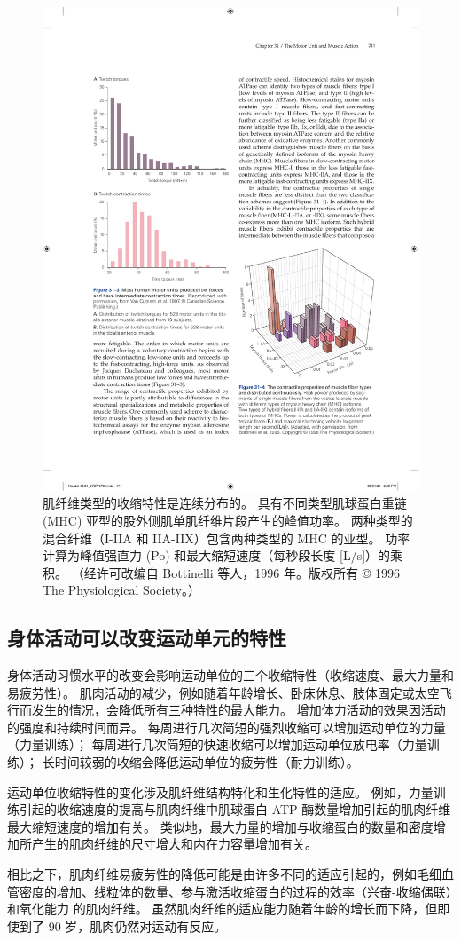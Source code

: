 \begin{figure}[htbp]
	\centering
	\includegraphics[width=0.5\linewidth]{chap31/fig_31_4}
	\caption{肌纤维类型的收缩特性是连续分布的。 具有不同类型肌球蛋白重链 (MHC) 亚型的股外侧肌单肌纤维片段产生的峰值功率。 两种类型的混合纤维（I-IIA 和 IIA-IIX）包含两种类型的 MHC 的亚型。 功率计算为峰值强直力 (Po) 和最大缩短速度（每秒段长度 [L/s]）的乘积。 （经许可改编自 Bottinelli 等人，1996 年。版权所有 © 1996 The Physiological Society。）}
	\label{fig:31_4}
\end{figure}


\subsection{身体活动可以改变运动单元的特性}

身体活动习惯水平的改变会影响运动单位的三个收缩特性（收缩速度、最大力量和易疲劳性）。
肌肉活动的减少，例如随着年龄增长、卧床休息、肢体固定或太空飞行而发生的情况，会降低所有三种特性的最大能力。
增加体力活动的效果因活动的强度和持续时间而异。
每周进行几次简短的强烈收缩可以增加运动单位的力量（力量训练）；
每周进行几次简短的快速收缩可以增加运动单位放电率（力量训练）；
长时间较弱的收缩会降低运动单位的疲劳性（耐力训练）。


运动单位收缩特性的变化涉及肌纤维结构特化和生化特性的适应。
例如，力量训练引起的收缩速度的提高与肌肉纤维中肌球蛋白 ATP 酶数量增加引起的肌肉纤维最大缩短速度的增加有关。
类似地，最大力量的增加与收缩蛋白的数量和密度增加所产生的肌肉纤维的尺寸增大和内在力容量增加有关。


相比之下，肌肉纤维易疲劳性的降低可能是由许多不同的适应引起的，例如毛细血管密度的增加、线粒体的数量、参与激活收缩蛋白的过程的效率（兴奋-收缩偶联）和氧化能力 的肌肉纤维。
虽然肌肉纤维的适应能力随着年龄的增长而下降，但即使到了 90 岁，肌肉仍然对运动有反应。



